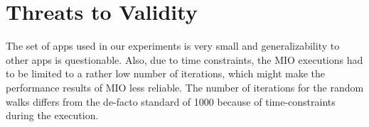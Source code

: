 \section{Threats to Validity} \label{sec:threats}
The set of apps used in our experiments is very small and generalizability to other apps is questionable.
Also, due to time constraints, the MIO executions had to be limited to a rather low number of iterations, which might make the performance results of MIO less reliable.
The number of iterations for the random walks differs from the de-facto standard of 1000 \cite{lio} because of time-constraints during the execution.